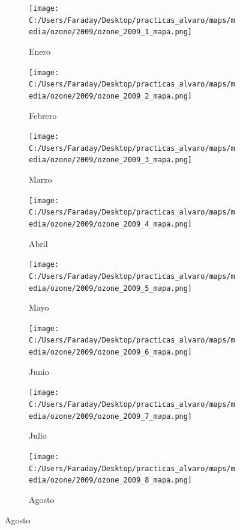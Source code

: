 \documentclass[12pt]{beamer}
\begin{document}
\begin{frame}[squeeze]
\tiny
\begin{figure}[H]
\centering
\begin{subfigure}[H]{0.20\textwidth}
\texttt{[image: C:/Users/Faraday/Desktop/practicas\_alvaro/maps/media/ozone/2009/ozone\_2009\_1\_mapa.png]}
\captionsetup{labelformat=empty}
\caption{\scriptsize Enero}
\label{fig:map-ozone-2009-1}
\end{subfigure}
%
\begin{subfigure}[H]{0.20\textwidth}
\texttt{[image: C:/Users/Faraday/Desktop/practicas\_alvaro/maps/media/ozone/2009/ozone\_2009\_2\_mapa.png]}
\captionsetup{labelformat=empty}
\caption{\scriptsize Febrero}
\label{fig:map-ozone-2009-2}
\end{subfigure}
%
\begin{subfigure}[H]{0.20\textwidth}
\texttt{[image: C:/Users/Faraday/Desktop/practicas\_alvaro/maps/media/ozone/2009/ozone\_2009\_3\_mapa.png]}
\captionsetup{labelformat=empty}
\caption{\scriptsize Marzo}
\label{fig:map-ozone-2009-3}
\end{subfigure}
%
\begin{subfigure}[H]{0.20\textwidth}
\texttt{[image: C:/Users/Faraday/Desktop/practicas\_alvaro/maps/media/ozone/2009/ozone\_2009\_4\_mapa.png]}
\captionsetup{labelformat=empty}
\caption{\scriptsize Abril}
\label{fig:map-ozone-2009-4}
\end{subfigure}

\begin{subfigure}[H]{0.20\textwidth}
\texttt{[image: C:/Users/Faraday/Desktop/practicas\_alvaro/maps/media/ozone/2009/ozone\_2009\_5\_mapa.png]}
\captionsetup{labelformat=empty}
\caption{\scriptsize Mayo}
\label{fig:map-ozone-2009-5}
\end{subfigure}
%
\begin{subfigure}[H]{0.20\textwidth}
\texttt{[image: C:/Users/Faraday/Desktop/practicas\_alvaro/maps/media/ozone/2009/ozone\_2009\_6\_mapa.png]}
\captionsetup{labelformat=empty}
\caption{\scriptsize Junio}
\label{fig:map-ozone-2009-6}
\end{subfigure}
%
\begin{subfigure}[H]{0.20\textwidth}
\texttt{[image: C:/Users/Faraday/Desktop/practicas\_alvaro/maps/media/ozone/2009/ozone\_2009\_7\_mapa.png]}
\captionsetup{labelformat=empty}
\caption{\scriptsize Julio}
\label{fig:map-ozone-2009-7}
\end{subfigure}
%
\begin{subfigure}[H]{0.20\textwidth}
\texttt{[image: C:/Users/Faraday/Desktop/practicas\_alvaro/maps/media/ozone/2009/ozone\_2009\_8\_mapa.png]}
\captionsetup{labelformat=empty}
\caption{\scriptsize Agosto}
\label{fig:map-ozone-2009-8}
\end{subfigure}


\end{figure}
\end{frame}
\end{document}
